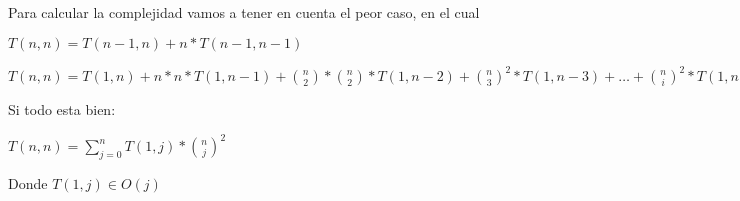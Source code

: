 Para calcular la complejidad vamos a tener en cuenta el peor caso, en el cual 


$T(n,n) = T(n-1,n) + n*T(n-1,n-1)$

$T(n,n) = T(1, n) + n*n * T(1, n-1) + \binom{n}{2} * \binom{n}{2} * T(1, n-2) + \binom{n}{3}^2 *T(1,n-3) + \hdots + \binom{n}{i}^2 * T(1, n-i) + \hdots + T(1,1)$

Si todo esta bien:

$T(n,n) = \sum_{j=0}^{n}{T(1,j) * \binom{n}{j}^2}$

Donde $T(1,j) \in O(j)$
